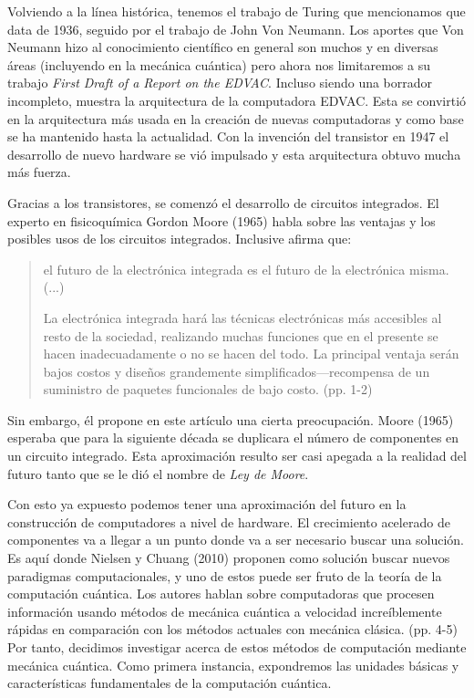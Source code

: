 \documentclass[11pt,a4paper]{article}
\begin{document}
Volviendo a la línea histórica, tenemos el trabajo de Turing que mencionamos que data de 1936, seguido por el trabajo de John Von Neumann. Los aportes que Von Neumann hizo al conocimiento científico en general son muchos y en diversas áreas (incluyendo en la mecánica cuántica) pero ahora nos limitaremos a su trabajo \textit{First Draft of a Report on the EDVAC}. Incluso siendo una borrador incompleto, muestra la arquitectura de la computadora EDVAC. Esta se convirtió en la arquitectura más usada en la creación de nuevas computadoras y como base se ha mantenido hasta la actualidad. Con la invención del transistor en 1947 el desarrollo de nuevo hardware se vió impulsado y esta arquitectura obtuvo mucha más fuerza.

Gracias a los transistores, se comenzó el desarrollo de circuitos integrados. El experto en fisicoquímica Gordon Moore (1965) habla sobre las ventajas y los posibles usos de los circuitos integrados. Inclusive afirma que: 
\begin{quote}
el futuro de la electrónica integrada es el futuro de la electrónica misma.(...)

La electrónica integrada hará las técnicas electrónicas más accesibles al resto de la sociedad, realizando muchas funciones que en el presente se hacen inadecuadamente o no se hacen del todo. La principal ventaja serán bajos costos y diseños grandemente simplificados---recompensa de un suministro de paquetes funcionales de bajo costo. (pp. 1-2)
\end{quote}
 Sin embargo, él propone en este artículo una cierta preocupación. Moore (1965) esperaba que para la siguiente década se duplicara el número de componentes en un circuito integrado. Esta aproximación resulto ser casi apegada a la realidad del futuro tanto que se le dió el nombre de \textit{Ley de Moore}.

Con esto ya expuesto podemos tener una aproximación del futuro en la construcción de computadores a nivel de hardware. El crecimiento acelerado de componentes va a llegar a un punto donde va a ser necesario buscar una solución. Es aquí donde Nielsen y Chuang (2010) proponen como solución buscar nuevos paradigmas computacionales, y uno de estos puede ser fruto de la teoría de la computación cuántica. Los autores hablan sobre computadoras que procesen información usando métodos de mecánica cuántica a velocidad increíblemente rápidas en comparación con los métodos actuales con mecánica clásica. (pp. 4-5) Por tanto, decidimos investigar acerca de estos métodos de computación mediante mecánica cuántica. Como primera instancia, expondremos las unidades básicas y características fundamentales de la computación cuántica.
\clearpage
\end{document}
